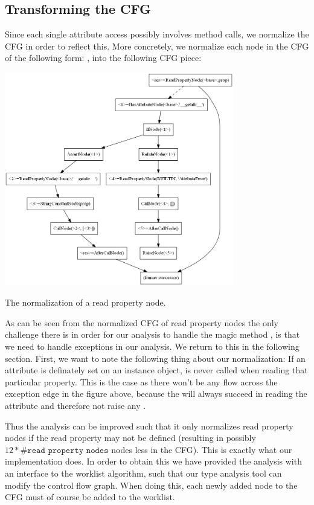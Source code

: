 \subsection{Transforming the CFG}
Since each single attribute access possibly involves method calls, we normalize the CFG in order to reflect this. More concretely, we normalize each node in the CFG of the following form: , into the following CFG piece:

\begin{listing}[H]
	\begin{center}
		\includegraphics[width=0.75\textwidth]{images/readproperty.png}
	\end{center}
	\vspace{-10pt}
	\caption{The normalization of a read property node.}
	\label{fig:ReadPropertyCFG}
\end{listing}

As can be seen from the normalized CFG of read property nodes the only challenge there is in order for our analysis to handle the magic method , is that we need to handle exceptions in our analysis. We return to this in the following section. First, we want to note the following thing about our normalization: If an attribute is definately set on an instance object,  is never called when reading that particular property. This is the case as there won't be any flow across the exception edge in the figure above, because the  will always succeed in reading the attribute and therefore not raise any .

Thus the analysis can be improved such that it only normalizes read property nodes if the read property may not be defined (resulting in possibly $12 * \#\texttt{read property nodes}$ nodes less in the CFG). This is exactly what our implementation does. In order to obtain this we have provided the analysis with an interface to the worklist algorithm, such that our type analysis tool can modify the control flow graph. When doing this, each newly added node to the CFG must of course be added to the worklist.